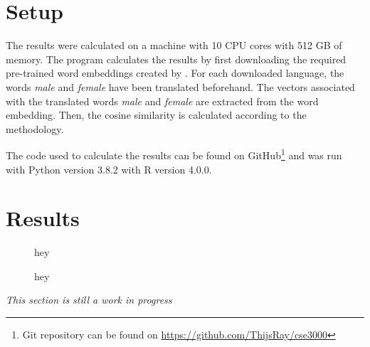 \section{Setup}
The results were calculated on a machine with 10 CPU cores with 512 GB of
memory. The program calculates the results by first downloading
the required pre-trained word embeddings created by \textcite{grave2018learning}. 
For each downloaded language, the words \textit{male} and \textit{female} have been
translated beforehand.
The vectors associated with the translated words \textit{male} and \textit{female} are
extracted from the word embedding. Then, the cosine similarity is calculated
according to the methodology.

The code used to calculate the results can be found on 
GitHub\footnote{Git repository can be found on \url{https://github.com/ThijsRay/cse3000}} 
and was run with Python version 3.8.2 with R version 4.0.0.

\section{Results}
\begin{figure*}
\caption{hey}
\end{figure*}

\begin{figure*}
\caption{hey}
\end{figure*}


\textit{This section is still a work in progress}
